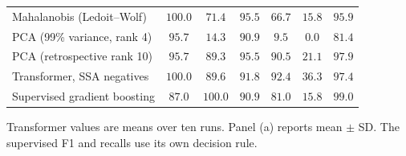 \begin{table}[!ht]
\begin{tabular*}{\textwidth}{@{\extracolsep{\fill}}lcccccc@{}}
Mahalanobis (Ledoit--Wolf) & $100.0$ & $71.4$ & $95.5$ & $66.7$ & $15.8$ & $95.9$ \\
PCA (99\% variance, rank 4) & $95.7$ & $14.3$ & $90.9$ & $9.5$ & $0.0$ & $81.4$ \\
PCA (retrospective rank 10) & $95.7$ & $89.3$ & $95.5$ & $90.5$ & $21.1$ & $97.9$ \\
Transformer, SSA negatives & $100.0$ & $89.6$ & $91.8$ & $92.4$ & $36.3$ & $97.4$ \\
Supervised gradient boosting & $87.0$ & $100.0$ & $90.9$ & $81.0$ & $15.8$ & $99.0$ \\
\bottomrule
\end{tabular*}
\par\smallskip\parbox{\textwidth}{Transformer values are means over ten runs. Panel (a) reports mean $\pm$ SD. The supervised F1 and recalls use its own decision rule.}
\end{table}
